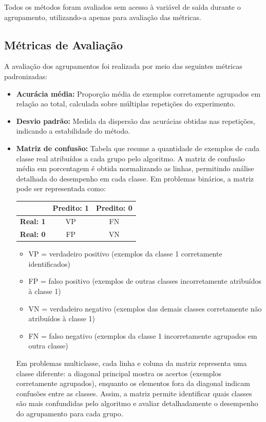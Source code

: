 Todos os métodos foram avaliados sem acesso à variável de saída durante o agrupamento, utilizando-a apenas para avaliação das métricas.

\subsection{Métricas de Avaliação}

A avaliação dos agrupamentos foi realizada por meio das seguintes métricas padronizadas:
\begin{itemize}
    \item \textbf{Acurácia média:} Proporção média de exemplos corretamente agrupados em relação ao total, calculada sobre múltiplas repetições do experimento.
    \item \textbf{Desvio padrão:} Medida da dispersão das acurácias obtidas nas repetições, indicando a estabilidade do método.
    \item \textbf{Matriz de confusão:} Tabela que resume a quantidade de exemplos de cada classe real atribuídos a cada grupo pelo algoritmo. A matriz de confusão média em porcentagem é obtida normalizando as linhas, permitindo análise detalhada do desempenho em cada classe. Em problemas binários, a matriz pode ser representada como:
    \begin{center}
    \begin{tabular}{|c|c|c|}
        \hline
        & \textbf{Predito: 1} & \textbf{Predito: 0} \\
        \hline
        \textbf{Real: 1} & VP & FN \\
        \hline
        \textbf{Real: 0} & FP & VN \\
        \hline
    \end{tabular}
    \end{center}
    \begin{itemize}
        \item VP = verdadeiro positivo (exemplos da classe 1 corretamente identificados)
        \item FP = falso positivo (exemplos de outras classes incorretamente atribuídos à classe 1)
        \item VN = verdadeiro negativo (exemplos das demais classes corretamente não atribuídos à classe 1)
        \item FN = falso negativo (exemplos da classe 1 incorretamente agrupados em outra classe)
    \end{itemize}
    Em problemas multiclasse, cada linha e coluna da matriz representa uma classe diferente: a diagonal principal mostra os acertos (exemplos corretamente agrupados), enquanto os elementos fora da diagonal indicam confusões entre as classes. Assim, a matriz permite identificar quais classes são mais confundidas pelo algoritmo e avaliar detalhadamente o desempenho do agrupamento para cada grupo.
\end{itemize}

